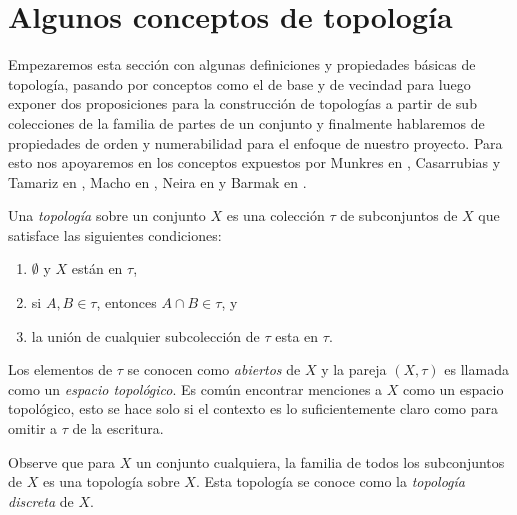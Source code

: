 \newpage

\section{Algunos conceptos de topología}\label{sec:NocionesTopología}

Empezaremos esta sección con algunas definiciones y propiedades básicas de topología, pasando por conceptos como el de base y de vecindad para luego exponer dos proposiciones para la construcción de topologías a partir de sub colecciones de la familia de partes de un conjunto y finalmente hablaremos de propiedades de orden y numerabilidad para el enfoque de nuestro proyecto. Para esto nos apoyaremos en los conceptos expuestos por Munkres en \cite{munkres}, Casarrubias y Tamariz en \cite{elementosTopologiaGeneral}, Macho en \cite{stadler2002}, Neira en \cite{NeiraNacional} y Barmak en \cite{barmak2011}.

\begin{definition}\label{def:topologia}
Una \textit{topología} sobre un conjunto $X$ es una colección $\tau$ de subconjuntos de $X$ que satisface las siguientes condiciones:
\begin{enumerate}
    \item $\emptyset$ y $X$ están en $\tau$,
    \item si $A,B\in\tau$, entonces $A\cap B\in\tau$, y 
    \item la unión de cualquier subcolección de $\tau$ esta en $\tau$.
\end{enumerate}
Los elementos de $\tau$ se conocen como \textit{abiertos} de $X$ y la pareja $(X,\tau)$ es llamada como un \textit{espacio topológico}. Es común encontrar menciones a $X$ como un espacio topológico, esto se hace solo si el contexto es lo suficientemente claro como para omitir a $\tau$ de la escritura.
\end{definition}

\begin{example}\label{ex:topologíaDiscreta} 
Observe que para $X$ un conjunto cualquiera, la familia de todos los subconjuntos de $X$ es una topología sobre $X$. Esta topología se conoce como la \textit{topología discreta} de $X$.
\end{example}

